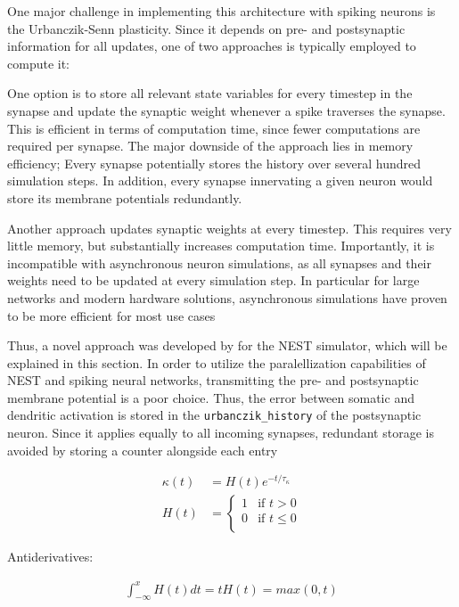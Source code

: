 One major challenge in implementing this architecture with spiking neurons is the Urbanczik-Senn plasticity. Since it
depends on pre- and postsynaptic information for all updates, one of two approaches is typically employed to compute
it:

One option is to store all relevant state variables for every timestep in the synapse and update the synaptic weight whenever
a spike traverses the synapse. This is efficient in terms of computation time, since fewer computations are required
per synapse. The major downside of the approach lies in memory efficiency; Every synapse potentially stores the history
over several hundred simulation steps. In addition, every synapse innervating a given neuron would store its membrane
potentials redundantly.

Another approach updates synaptic weights at every timestep. This requires very little memory, but substantially increases
computation time. Importantly, it is incompatible with asynchronous neuron simulations, as all synapses and their weights
need to be updated at every simulation step. In particular for large networks and modern hardware solutions, asynchronous
simulations have proven to be more efficient for most use cases 

Thus, a novel approach was developed by \cite{Stapmanns2021} for the NEST simulator, which will be explained in this
section. In order to utilize the paralellization capabilities of NEST and spiking neural networks, transmitting
the pre- and postsynaptic membrane potential is a poor choice. Thus, the error between somatic and dendritic activation
is stored in the \texttt{urbanczik\_history} of the postsynaptic neuron. Since it applies equally to all incoming
synapses, redundant storage is avoided by storing a counter alongside each entry



\begin{align}
  \kappa(t) & = H(t)e^{-t/\tau_{\kappa}} \\
  H(t)      & =
  \begin{cases}
    1 & \text{if $t > 0$}    \\
    0 & \text{if $t \leq 0$} \\
  \end{cases}
\end{align}

Antiderivatives:

\begin{align}
  \int_{-\infty}^x H(t)dt = tH(t) = max(0,t)
\end{align}

